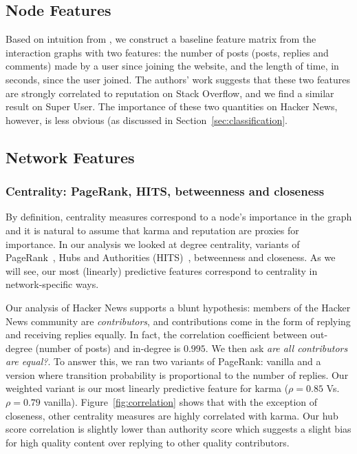 \documentclass[11pt]{article}
\begin{document}
\subsection{Node Features}

Based on intuition from \citet{movshovitzanalysis}, we construct a baseline
feature matrix from the interaction graphs with two features: the number of
posts (posts, replies and comments) made by a user since joining the website,
and the length of time, in seconds, since the user joined. The authors' work
suggests that these two features are strongly correlated to reputation on Stack
Overflow, and we find a similar result on Super User. The importance of these
two quantities on Hacker News, however, is less obvious (as discussed in
Section~\ref{sec:classification}.

\subsection{Network Features}

\subsubsection{Centrality: PageRank, HITS, betweenness and closeness}
\label{sec:centrality}

By definition, centrality measures correspond to a node's importance in the
graph and it is natural to assume that karma and reputation are proxies for
importance. In our analysis we looked at degree centrality, variants of
PageRank~\cite{page1999pagerank}, Hubs and Authorities
(HITS)~\cite{kleinberg1999authoritative}, betweenness and closeness. As we will
see, our most (linearly) predictive features correspond to centrality in
network-specific ways.

Our analysis of Hacker News supports a blunt hypothesis: members of the Hacker
News community are \textit{contributors}, and contributions come in the form of
replying and receiving replies equally. In fact, the correlation coefficient
between out-degree (number of posts) and in-degree is $0.995$. We then ask
\textit{are all contributors are equal?}. To answer this, we ran two variants of
PageRank: vanilla and a version where transition probability is proportional to
the number of replies. Our weighted variant is our most linearly predictive
feature for karma ($\rho = 0.85$ Vs. $\rho=0.79$ vanilla).
Figure~\ref{fig:correlation} shows that with the exception of closeness, other
centrality measures are highly correlated with karma.  Our hub score correlation
is slightly lower than authority score which suggests a slight bias for high
quality content over replying to other quality contributors.
\end{document}
